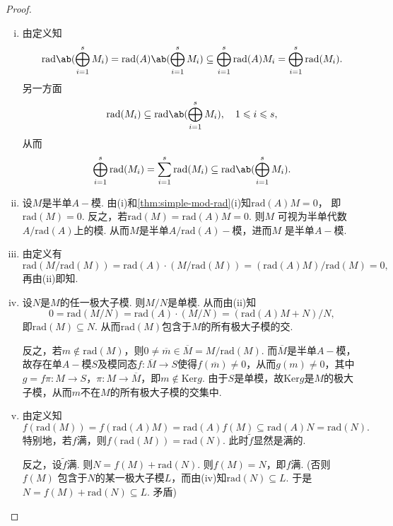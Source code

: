 \begin{proof}
    \begin{enumerate}[(i)]
        \item 由定义知
        \[ \mathrm{rad}\ab(\bigoplus_{i=1}^s M_i) = \mathrm{rad}(A)\ab(\bigoplus_{i=1}^s M_i) \subseteq \bigoplus_{i=1}^s \mathrm{rad}(A)M_i = \bigoplus_{i=1}^s \mathrm{rad}(M_i). \]
        另一方面
        \[ \mathrm{rad}(M_i) \subseteq \mathrm{rad}\ab(\bigoplus_{i=1}^s M_i), \quad 1 \leq i \leq s, \]
        从而
        \[ \bigoplus_{i=1}^s \mathrm{rad}(M_i) = \sum_{i=1}^s \mathrm{rad}(M_i) \subseteq \mathrm{rad}\ab(\bigoplus_{i=1}^s M_i). \]
        \item 设$M$是半单$A-\!\!$模. 由(i)和\cref{thm:simple-mod-rad}(i)知$\mathrm{rad}(A)M = 0$，
        即$\mathrm{rad}(M) = 0$. 反之，若$\mathrm{rad}(M) = \mathrm{rad}(A)M = 0$. 则$M$
        可视为半单代数$A/\mathrm{rad}(A)$上的模. 从而$M$是半单$A/\mathrm{rad}(A)-\!\!$模，进而$M$
        是半单$A-\!\!$模.
        \item 由定义有
        \[ \mathrm{rad}(M/\mathrm{rad}(M)) = \mathrm{rad}(A) \cdot (M/\mathrm{rad}(M)) =
        (\mathrm{rad}(A)M)/\mathrm{rad}(M) = 0, \]
        再由(ii)即知.
        \item 设$N$是$M$的任一极大子模. 则$M/N$是单模. 从而由(ii)知
        \[ 0 = \mathrm{rad}(M/N) = \mathrm{rad}(A) \cdot (M/N) = (\mathrm{rad}(A)M + N)/N, \]
        即$\mathrm{rad}(M) \subseteq N$. 从而$\mathrm{rad}(M)$包含于$M$的所有极大子模的交.\par
        反之，若$m \notin \mathrm{rad}(M)$，则$0 \neq \overline{m} \in \overline{M} =
        M/\mathrm{rad}(M)$. 而$\overline{M}$是半单$A-\!\!$模，故存在单$A-\!\!$模$S$及模同态$f:
        \overline{M} \longrightarrow S$使得$f(\overline{m}) \neq 0$，从而$g(m) \neq 0$，其中$g =
        f\pi: M \longrightarrow S$，$\pi: M \longrightarrow \overline{M}$，即$m \notin \mathrm{Ker}g$.
        由于$S$是单模，故$\mathrm{Ker}g$是$M$的极大子模，从而$m$不在$M$的所有极大子模的交集中.
        \item 由定义知
        \[ f(\mathrm{rad}(M)) = f(\mathrm{rad}(A)M) = \mathrm{rad}(A)f(M) \subseteq \mathrm{rad}(A)N =
        \mathrm{rad}(N). \]
        特别地，若$f$满，则$f(\mathrm{rad}(M)) = \mathrm{rad}(N)$. 此时$\tilde{f}$显然是满的.\par
        反之，设$\tilde{f}$满. 则$N = f(M) + \mathrm{rad}(N)$. 则$f(M) = N$，即$f$满. (否则$f(M)$
        包含于$N$的某一极大子模$L$，而由(iv)知$\mathrm{rad}(N) \subseteq L$. 于是$N = f(M) +
        \mathrm{rad}(N) \subseteq L$. 矛盾\!) \qedhere
    \end{enumerate}
\end{proof}

